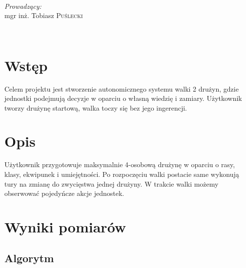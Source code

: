 \documentclass[11pt]{article}
\begin{document}
\begin{titlepage}
\begin{minipage}{0.5\textwidth}
\begin{flushleft}
\end{flushleft}
\end{minipage}
~
\begin{minipage}{0.4\textwidth}
\begin{flushright} \large
\emph{Prowadzący:} \\ 
mgr inż. Tobiasz \textsc{Puślecki} %
\end{flushright}
\end{minipage}\\[5cm]

\vfill %
\end{titlepage}
\newpage




\section{Wstęp}

Celem projektu jest stworzenie autonomicznego systemu walki 2 drużyn, gdzie jednostki podejmują decyzje w oparciu o własną wiedzię i zamiary. Użytkownik tworzy drużynę startową, walka toczy się bez jego ingerencji.

\section{Opis}

Użytkownik przygotowuje maksymalnie 4-osobową drużynę w oparciu o rasy, klasy, ekwipunek i umiejętności. Po rozpoczęciu walki postacie same wykonują tury na zmianę do zwycięstwa jednej drużyny. W trakcie walki możemy obserwować pojedyńcze akcje jednostek.






\section{Wyniki pomiarów}

\subsection{Algorytm}
\end{document}

